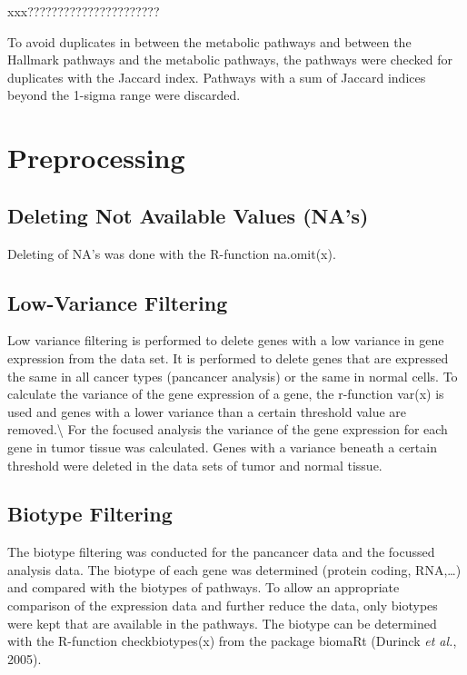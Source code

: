 \documentclass[
  parskip,
  oneside]{scrreprt}
\begin{document}
xxx??????????????????????

To avoid duplicates in between the metabolic pathways and between the
Hallmark pathways and the metabolic pathways, the pathways were checked
for duplicates with the Jaccard index. Pathways with a sum of Jaccard
indices beyond the 1-sigma range were discarded.

\hypertarget{preprocessing}{%
\section{Preprocessing}\label{preprocessing}}

\hypertarget{deleting-not-available-values-nas}{%
\subsection{Deleting Not Available Values
(NA's)}\label{deleting-not-available-values-nas}}

Deleting of NA's was done with the R-function na.omit(x).

\hypertarget{low-variance-filtering}{%
\subsection{Low-Variance Filtering}\label{low-variance-filtering}}

Low variance filtering is performed to delete genes with a low variance
in gene expression from the data set. It is performed to delete genes
that are expressed the same in all cancer types (pancancer analysis) or
the same in normal cells. To calculate the variance of the gene
expression of a gene, the r-function var(x) is used and genes with a
lower variance than a certain threshold value are
removed.\textbackslash{} For the focused analysis the variance of the
gene expression for each gene in tumor tissue was calculated. Genes with
a variance beneath a certain threshold were deleted in the data sets of
tumor and normal tissue.

\hypertarget{biotype-filtering}{%
\subsection{Biotype Filtering}\label{biotype-filtering}}

The biotype filtering was conducted for the pancancer data and the
focussed analysis data. The biotype of each gene was determined (protein
coding, RNA,\ldots) and compared with the biotypes of pathways. To allow
an appropriate comparison of the expression data and further reduce the
data, only biotypes were kept that are available in the pathways. The
biotype can be determined with the R-function checkbiotypes(x) from the
package biomaRt (Durinck \emph{et al.}, 2005).
\end{document}

